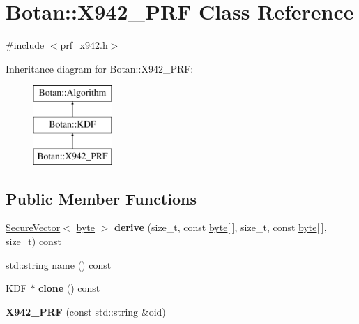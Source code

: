 \hypertarget{classBotan_1_1X942__PRF}{\section{Botan\-:\-:X942\-\_\-\-P\-R\-F Class Reference}
\label{classBotan_1_1X942__PRF}
}


{\ttfamily \#include $<$prf\-\_\-x942.\-h$>$}

Inheritance diagram for Botan\-:\-:X942\-\_\-\-P\-R\-F\-:\begin{figure}[H]
\begin{center}
\leavevmode
\includegraphics[height=3.000000cm]{classBotan_1_1X942__PRF}
\end{center}
\end{figure}
\subsection*{Public Member Functions}
\begin{DoxyCompactItemize}
\item 
\hypertarget{classBotan_1_1X942__PRF_a375020a2ddc528fa0e3b8402ba5f0091}{\hyperlink{classBotan_1_1SecureVector}{Secure\-Vector}$<$ \hyperlink{namespaceBotan_a7d793989d801281df48c6b19616b8b84}{byte} $>$ {\bfseries derive} (size\-\_\-t, const \hyperlink{namespaceBotan_a7d793989d801281df48c6b19616b8b84}{byte}\mbox{[}$\,$\mbox{]}, size\-\_\-t, const \hyperlink{namespaceBotan_a7d793989d801281df48c6b19616b8b84}{byte}\mbox{[}$\,$\mbox{]}, size\-\_\-t) const }\label{classBotan_1_1X942__PRF_a375020a2ddc528fa0e3b8402ba5f0091}

\item 
std\-::string \hyperlink{classBotan_1_1X942__PRF_ac5f1cd090b04a93542ed18d4e1ab5933}{name} () const 
\item 
\hypertarget{classBotan_1_1X942__PRF_a2dbe9e8ebd6ababf7a27c0d78ed7bcb5}{\hyperlink{classBotan_1_1KDF}{K\-D\-F} $\ast$ {\bfseries clone} () const }\label{classBotan_1_1X942__PRF_a2dbe9e8ebd6ababf7a27c0d78ed7bcb5}

\item 
\hypertarget{classBotan_1_1X942__PRF_aec745b04417ae66d7887f68b5213189a}{{\bfseries X942\-\_\-\-P\-R\-F} (const std\-::string \&oid)}\label{classBotan_1_1X942__PRF_aec745b04417ae66d7887f68b5213189a}

\end{DoxyCompactItemize}


